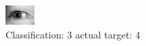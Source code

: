 \begin{figure}[h!]
\begin{center}
\includegraphics[width=0.60\columnwidth]{figures/ID3144_class_3_target_4.png}
\end{center}
\caption{ Classification: 3 actual target: 4}
\label{fig:ID3144_class_3_target_4}
\end{figure}
